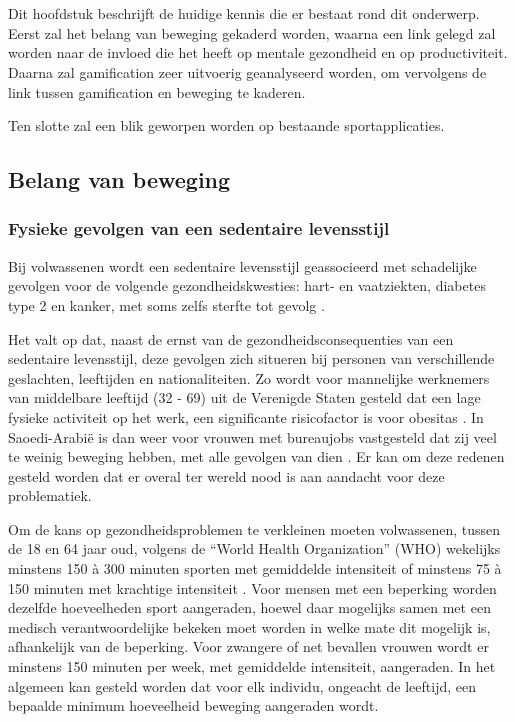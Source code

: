 \chapter{}%
\label{ch:stand-van-zaken}

Dit hoofdstuk beschrijft de huidige kennis die er bestaat rond dit onderwerp. Eerst zal het belang van beweging gekaderd worden, waarna een link gelegd zal worden naar de invloed die het heeft op mentale gezondheid en op productiviteit. Daarna zal gamification zeer uitvoerig geanalyseerd worden, om vervolgens de link tussen gamification en beweging te kaderen.

Ten slotte zal een blik geworpen worden op bestaande sportapplicaties.

\section{Belang van beweging}

\subsection{Fysieke gevolgen van een sedentaire levensstijl}
\label{ssec:fysieke-gevolgen}
Bij volwassenen wordt een sedentaire levensstijl geassocieerd met schadelijke gevolgen voor de volgende gezondheidskwesties: hart- en vaatziekten, diabetes type 2 en kanker, met soms zelfs sterfte tot gevolg \autocite{Bull2020}.

Het valt op dat, naast de ernst van de gezondheidsconsequenties van een sedentaire levensstijl, deze gevolgen zich situeren bij personen van verschillende geslachten, leeftijden en nationaliteiten. Zo wordt voor mannelijke werknemers van middelbare leeftijd (32 - 69) uit de Verenigde Staten gesteld dat een lage fysieke activiteit op het werk, een significante risicofactor is voor obesitas \autocite{Choi2010}. In Saoedi-Arabië is dan weer voor vrouwen met bureaujobs vastgesteld dat zij veel te weinig beweging hebben, met alle gevolgen van dien \autocite{Albawardi2017}. Er kan om deze redenen gesteld worden dat er overal ter wereld nood is aan aandacht voor deze problematiek.

Om de kans op gezondheidsproblemen te verkleinen moeten volwassenen, tussen de 18 en 64 jaar oud, volgens de ``World Health Organization'' (WHO) wekelijks minstens 150 à 300 minuten sporten met gemiddelde intensiteit of minstens 75 à 150 minuten met krachtige intensiteit \autocite{Bull2020}. Voor mensen met een beperking worden dezelfde hoeveelheden sport aangeraden, hoewel daar mogelijks samen met een medisch verantwoordelijke bekeken moet worden in welke mate dit mogelijk is, afhankelijk van de beperking. Voor zwangere of net bevallen vrouwen wordt er minstens 150 minuten per week, met gemiddelde intensiteit, aangeraden. In het algemeen kan gesteld worden dat voor elk individu, ongeacht de leeftijd, een bepaalde minimum hoeveelheid beweging aangeraden wordt.


